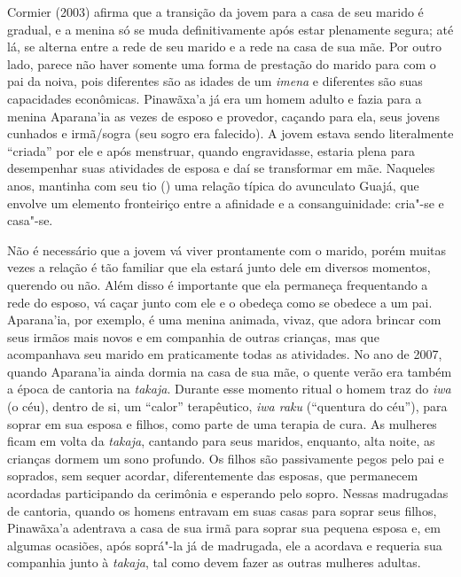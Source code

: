 Cormier (2003) afirma que a transição da jovem para a casa de seu marido
é gradual, e a menina só se muda definitivamente após estar plenamente
segura; até lá, se alterna entre a rede de seu marido e a rede na casa
de sua mãe. Por outro lado, parece não haver somente uma forma de
prestação do marido para com o pai da noiva, pois diferentes são as
idades de um \emph{imena} e diferentes são suas capacidades econômicas.
Pinawãxa'a já era um homem adulto e fazia para a menina Aparana'ia as
vezes de esposo e provedor, caçando para ela, seus jovens cunhados e
irmã/sogra (seu sogro era falecido). A jovem estava sendo literalmente
``criada'' por ele e após menstruar, quando engravidasse, estaria plena
para desempenhar suas atividades de esposa e daí se transformar em mãe.
Naqueles anos, mantinha com seu tio () uma relação típica do
avunculato Guajá, que envolve um elemento fronteiriço entre a afinidade
e a consanguinidade: cria"-se e casa"-se.

Não é necessário que a jovem vá viver prontamente com o marido, porém
muitas vezes a relação é tão familiar que ela estará junto dele em
diversos momentos, querendo ou não. Além disso é importante que ela
permaneça frequentando a rede do esposo, vá caçar junto com ele e o
obedeça como se obedece a um pai. Aparana'ia, por exemplo, é uma menina
animada, vivaz, que adora brincar com seus irmãos mais novos e em
companhia de outras crianças, mas que acompanhava seu marido em
praticamente todas as atividades. No ano de 2007, quando Aparana'ia
ainda dormia na casa de sua mãe, o quente verão era também a época de
cantoria na \emph{takaja}. Durante esse momento ritual o homem traz do
\emph{iwa} (o céu), dentro de si, um ``calor'' terapêutico, \emph{iwa
raku} (``quentura do céu''), para soprar em sua esposa e filhos, como
parte de uma terapia de cura. As mulheres ficam em volta da
\emph{takaja}, cantando para seus maridos, enquanto, alta noite, as
crianças dormem um sono profundo. Os filhos são passivamente pegos pelo
pai e soprados, sem sequer acordar, diferentemente das esposas, que
permanecem acordadas participando da cerimônia e esperando pelo sopro.
Nessas madrugadas de cantoria, quando os homens entravam em suas casas
para soprar seus filhos, Pinawãxa'a adentrava a casa de sua irmã para
soprar sua pequena esposa e, em algumas ocasiões, após soprá"-la já de
madrugada, ele a acordava e requeria sua companhia junto à
\emph{takaja}, tal como devem fazer as outras mulheres adultas.

\asterisc

